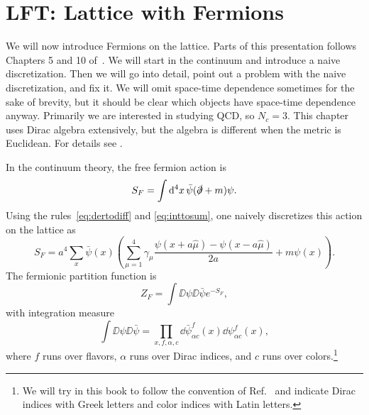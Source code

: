\chapter{LFT: Lattice with Fermions}\label{ch:ferm}

We will now introduce Fermions on the lattice. Parts of this presentation 
follows Chapters 5 and 10 of~\cite{gattringer_quantum_2010}. 
We will start in the continuum
and introduce a naive discretization. Then we will go into detail, point
out a problem with the naive discretization, and fix it. We will omit
space-time dependence sometimes for the sake of brevity, but it should
be clear which objects have space-time dependence anyway. Primarily
we are interested in studying QCD, so $N_c=3$. This chapter uses Dirac
algebra extensively, but the algebra is different when the metric
is Euclidean. For details see .

In the continuum theory, the free fermion action is 
\begin{equation}
  S_F=\int\dd[4]{x}\bar{\psi}(\slashed{\partial}+m)\psi.
\end{equation}
Using the rules~\eqref{eq:dertodiff} and \eqref{eq:inttosum}, one naively
discretizes this action on the lattice as
\begin{equation}\label{eq:naivefermact}
  S_F=a^4\sum_x\bar{\psi}(x)\left(\sum_{\mu=1}^4\gamma_\mu
       \frac{\psi(x+a\hat{\mu})-\psi(x-a\hat{\mu})}{2a}
       +m\psi(x)\right).
\end{equation}
The fermionic partition function is
\begin{equation}
  Z_F=\int\DD{\psi}\DD{\bar{\psi}}e^{-S_F},
\end{equation}
with integration measure
\begin{equation}
  \int\DD{\psi}\DD{\bar{\psi}}
   =\prod_{x,f,\alpha,c}\dd{\bar{\psi}^f_{\alpha c}(x)}
                        \dd{\psi^f_{\alpha c}(x)},
\end{equation}
where $f$ runs over flavors, $\alpha$ runs over Dirac indices, and $c$
runs over colors.\footnote{We will try in this book to follow the convention of
Ref.~\cite{gattringer_quantum_2010} and indicate Dirac indices with Greek
letters and color indices with Latin letters.}


